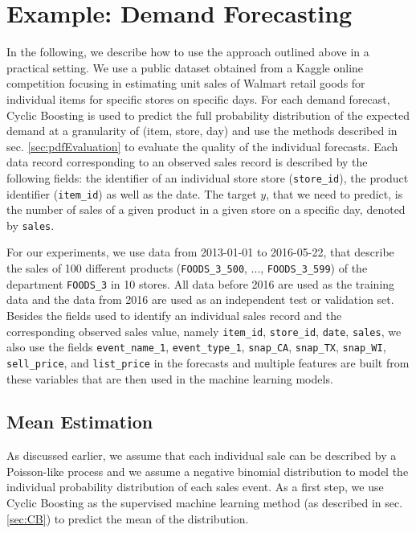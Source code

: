 \documentclass[BCOR=1mm, DIV=calc,10pt,
twoside=true,
twocolumn,
headings=normal]{scrartcl}
\begin{document}
\section{Example: Demand Forecasting}
\label{sec:example}

In the following, we describe how to use the approach outlined above in a practical setting. We use a public dataset obtained from a Kaggle online competition focusing in estimating unit sales of Walmart retail goods \cite{kaggle_data} for individual items for specific stores on specific days. For each demand forecast, Cyclic Boosting is used to predict the full probability distribution of the expected demand at a granularity of (item, store, day) and use the methods described in sec. \ref{sec:pdfEvaluation} to evaluate the quality of the individual forecasts. Each data record corresponding to an observed sales record is described by the following fields: the identifier of an individual store store (\texttt{store\_id}), the product identifier (\texttt{item\_id}) as well as the date. The target $y$, that we need to predict, is the number of sales of a given product in a given store on a specific day, denoted by \texttt{sales}.

For our experiments, we use data from 2013-01-01 to 2016-05-22, that describe the sales of 100 different products (\texttt{FOODS\_3\_500}, ..., \texttt{FOODS\_3\_599}) of the department \texttt{FOODS\_3} in 10 stores.  All data before 2016 are used as the training data and the data from 2016 are used as an independent test or validation set. Besides the fields used to identify an individual sales record and the corresponding observed sales value, namely \texttt{item\_id}, \texttt{store\_id}, \texttt{date}, \texttt{sales}, we also use the fields \texttt{event\_name\_1}, \texttt{event\_type\_1}, \texttt{snap\_CA}, \texttt{snap\_TX}, \texttt{snap\_WI}, \texttt{sell\_price}, and \texttt{list\_price} in the forecasts and multiple features are built from these variables that are then used in the machine learning models.

\subsection{Mean Estimation}
\label{sec:example_mean}

As discussed earlier, we assume that each individual sale can be described by a Poisson-like process and we assume a negative binomial distribution to model the individual probability distribution of each sales event. As a first step, we use Cyclic Boosting as the supervised machine learning method (as described in sec. \ref{sec:CB}) to predict the mean of the distribution.
\end{document}
